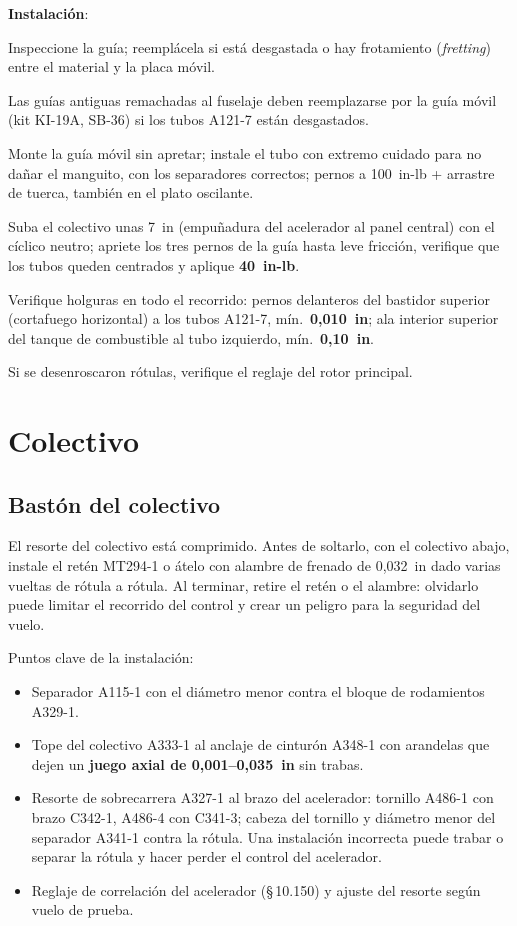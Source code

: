 \textbf{Instalación}:
\begin{pasos}
\item Inspeccione la guía; reemplácela si está desgastada o hay frotamiento (\emph{fretting}) entre el material y la placa móvil.
\item Las guías antiguas remachadas al fuselaje deben reemplazarse por la guía móvil (kit KI-19A, SB-36) si los tubos A121-7 están desgastados.
\item Monte la guía móvil sin apretar; instale el tubo con extremo cuidado para no dañar el manguito, con los separadores correctos; pernos a 100~in-lb + arrastre de tuerca, también en el plato oscilante.
\item Suba el colectivo unas 7~in (empuñadura del acelerador al panel central) con el cíclico neutro; apriete los tres pernos de la guía hasta leve fricción, verifique que los tubos queden centrados y aplique \textbf{40~in-lb}.
\item Verifique holguras en todo el recorrido: pernos delanteros del bastidor superior (cortafuego horizontal) a los tubos A121-7, mín.\ \textbf{0,010~in}; ala interior superior del tanque de combustible al tubo izquierdo, mín.\ \textbf{0,10~in}.
\item Si se desenroscaron rótulas, verifique el reglaje del rotor principal.
\end{pasos}

\section{Colectivo}

\subsection{Bastón del colectivo}

\begin{advertencia}
El resorte del colectivo está comprimido. Antes de soltarlo, con el colectivo abajo, instale el retén MT294-1 o átelo con alambre de frenado de 0,032~in dado varias vueltas de rótula a rótula. Al terminar, retire el retén o el alambre: olvidarlo puede limitar el recorrido del control y crear un peligro para la seguridad del vuelo.
\end{advertencia}

Puntos clave de la instalación:
\begin{itemize}
\item Separador A115-1 con el diámetro menor contra el bloque de rodamientos A329-1.
\item Tope del colectivo A333-1 al anclaje de cinturón A348-1 con arandelas que dejen un \textbf{juego axial de 0,001--0,035~in} sin trabas.
\item Resorte de sobrecarrera A327-1 al brazo del acelerador: tornillo A486-1 con brazo C342-1, A486-4 con C341-3; cabeza del tornillo y diámetro menor del separador A341-1 contra la rótula. Una instalación incorrecta puede trabar o separar la rótula y hacer perder el control del acelerador.
\item Reglaje de correlación del acelerador (\S\,10.150) y ajuste del resorte según vuelo de prueba.
\end{itemize}

